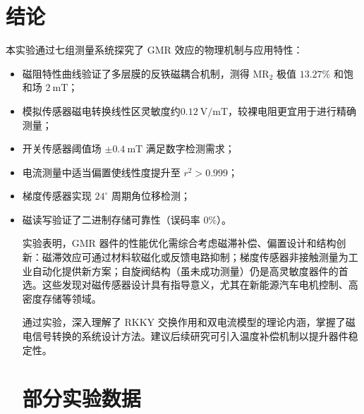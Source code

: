 \documentclass{thuemp}
\begin{document}
\section{结论}
本实验通过七组测量系统探究了 GMR 效应的物理机制与应用特性：
\begin{itemize}
    \item 磁阻特性曲线验证了多层膜的反铁磁耦合机制，测得 $\mathrm{MR_2}$ 极值 $13.27\%$ 和饱和场 $2\ \mathrm{mT}$；
    \item 模拟传感器磁电转换线性区灵敏度约$0.12\ \mathrm{V/mT}$，较裸电阻更宜用于进行精确测量；
    \item 开关传感器阈值场 $\pm 0.4\ \mathrm{mT}$ 满足数字检测需求；
    \item 电流测量中适当偏置使线性度提升至 $r^2 > 0.999$；
    \item 梯度传感器实现 $24^\circ$ 周期角位移检测；
    \item 磁读写验证了二进制存储可靠性（误码率 0\%）。

实验表明，GMR 器件的性能优化需综合考虑磁滞补偿、偏置设计和结构创新：磁滞效应可通过材料软磁化或反馈电路抑制；梯度传感器非接触测量为工业自动化提供新方案；自旋阀结构（虽未成功测量）仍是高灵敏度器件的首选。这些发现对磁传感器设计具有指导意义，尤其在新能源汽车电机控制、高密度存储等领域。

通过实验，深入理解了 RKKY 交换作用和双电流模型的理论内涵，掌握了磁电信号转换的系统设计方法。建议后续研究可引入温度补偿机制以提升器件稳定性。



\renewcommand\refname{\heiti\wuhao\centerline{参考文献}\global\def\refname{参考文献}}
\vskip 12pt


\let\OLDthebibliography\thebibliography
\renewcommand\thebibliography[1]{
  \OLDthebibliography{#1}
  \setlength{\parskip}{0pt}
  \setlength{\itemsep}{0pt plus 0.3ex}
}

{
\renewcommand{\baselinestretch}{0.9}
\liuhao


}

\appendix
\section{部分实验数据}


\end{itemize}
\end{document}
